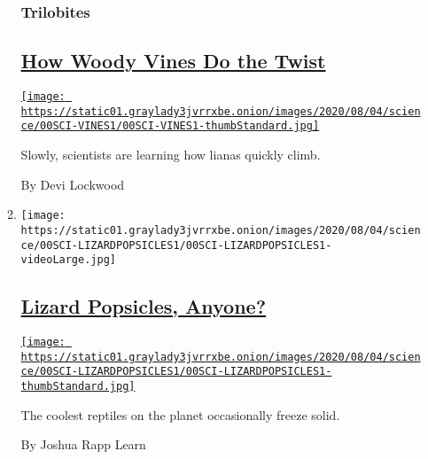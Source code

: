 \begin{enumerate}
\begin{enumerate}
    \hypertarget{trilobites}{%
    \subsubsection{Trilobites}\label{trilobites}}

    \hypertarget{how-woody-vines-do-the-twist}{%
    \subsection{\texorpdfstring{\href{/2020/08/01/science/vines-lianas-panama.html}{How
    Woody Vines Do the
    Twist}}{How Woody Vines Do the Twist}}\label{how-woody-vines-do-the-twist}}

    \href{/2020/08/01/science/vines-lianas-panama.html}{\texttt{[image: https://static01.graylady3jvrrxbe.onion/images/2020/08/04/science/00SCI-VINES1/00SCI-VINES1-thumbStandard.jpg]}}

    Slowly, scientists are learning how lianas quickly climb.

    By Devi Lockwood
  \item
    \texttt{[image: https://static01.graylady3jvrrxbe.onion/images/2020/08/04/science/00SCI-LIZARDPOPSICLES1/00SCI-LIZARDPOPSICLES1-videoLarge.jpg]}

    \hypertarget{lizard-popsicles-anyone}{%
    \subsection{\texorpdfstring{\href{/2020/07/31/science/lizards-liolaemus-argentina.html}{Lizard
    Popsicles,
    Anyone?}}{Lizard Popsicles, Anyone?}}\label{lizard-popsicles-anyone}}

    \href{/2020/07/31/science/lizards-liolaemus-argentina.html}{\texttt{[image: https://static01.graylady3jvrrxbe.onion/images/2020/08/04/science/00SCI-LIZARDPOPSICLES1/00SCI-LIZARDPOPSICLES1-thumbStandard.jpg]}}

    The coolest reptiles on the planet occasionally freeze solid.

    By Joshua Rapp Learn
  \end{enumerate}
\end{enumerate}

